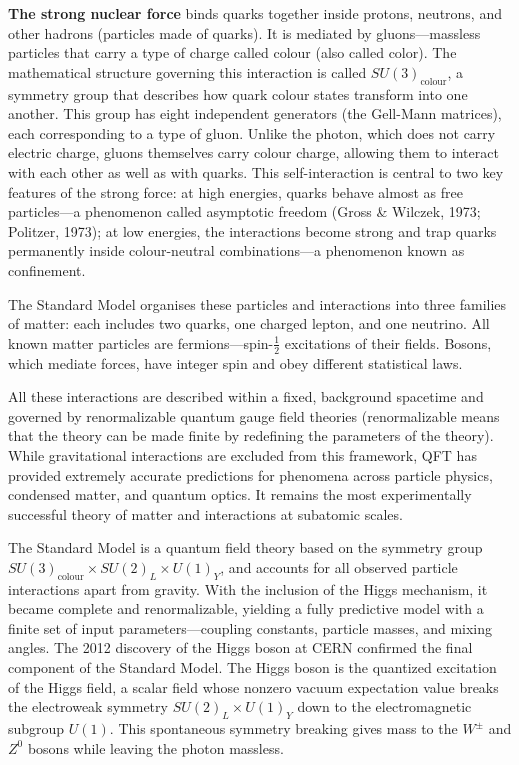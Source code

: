 \textbf{The strong nuclear force} binds quarks together inside protons, neutrons, and other hadrons (particles made of quarks). It is mediated by gluons—massless particles that carry a type of charge called colour (also called color). The mathematical structure governing this interaction is called \(SU(3)_\text{colour}\), a symmetry group that describes how quark colour states transform into one another. This group has eight independent generators (the Gell-Mann matrices), each corresponding to a type of gluon. Unlike the photon, which does not carry electric charge, gluons themselves carry colour charge, allowing them to interact with each other as well as with quarks. This self-interaction is central to two key features of the strong force: at high energies, quarks behave almost as free particles—a phenomenon called asymptotic freedom (Gross \& Wilczek, 1973; Politzer, 1973); at low energies, the interactions become strong and trap quarks permanently inside colour-neutral combinations—a phenomenon known as confinement.

The Standard Model organises these particles and interactions into three families of matter: each includes two quarks, one charged lepton, and one neutrino. All known matter particles are fermions—spin-$\frac{1}{2}$ excitations of their fields. Bosons, which mediate forces, have integer spin and obey different statistical laws.

All these interactions are described within a fixed, background spacetime and governed by renormalizable quantum gauge field theories (renormalizable means that the theory can be made finite by redefining the parameters of the theory). While gravitational interactions are excluded from this framework, QFT has provided extremely accurate predictions for phenomena across particle physics, condensed matter, and quantum optics. It remains the most experimentally successful theory of matter and interactions at subatomic scales.

The Standard Model is a quantum field theory based on the symmetry group $SU(3)_\text{colour} \times SU(2)_L \times U(1)_Y$, and accounts for all observed particle interactions apart from gravity. With the inclusion of the Higgs mechanism, it became complete and renormalizable, yielding a fully predictive model with a finite set of input parameters—coupling constants, particle masses, and mixing angles. The 2012 discovery of the Higgs boson at CERN confirmed the final component of the Standard Model. The Higgs boson is the quantized excitation of the Higgs field, a scalar field whose nonzero vacuum expectation value breaks the electroweak symmetry \(SU(2)_L\times U(1)_Y\) down to the electromagnetic subgroup \(U(1)\). This spontaneous symmetry breaking gives mass to the \(W^\pm\) and \(Z^0\) bosons while leaving the photon massless.

